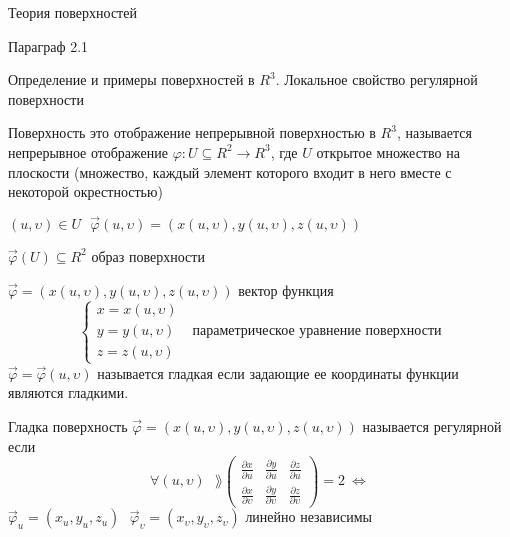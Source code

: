 \begin{title}
  Теория поверхностей
\end{title}

\begin{title}[\Large]
  Параграф 2.1
\end{title}

\begin{title}[\Large]
  Определение и примеры поверхностей в $R^3$. Локальное свойство регулярной
  поверхности
\end{title}

\begin{define}[поверхности]
  Поверхность это отображение непрерывной поверхностью в $R^3$, называется
  непрерывное отображение $\varphi: U \subseteq R^2 \to R^3$, где
  $U$ открытое множество на плоскости (множество, каждый элемент которого входит
  в него вместе с некоторой окрестностью)

  $(u, \upsilon) \in U ~~~ \vec \varphi(u, \upsilon) = (x(u, \upsilon),
  y(u, \upsilon), z(u, \upsilon))$

  $\vec \varphi (U) \subseteq R^2$ образ поверхности

  $\vec \varphi = (x(u, \upsilon), y(u, \upsilon), z(u, \upsilon))$ вектор
  функция
  $$
  \left\{
  \begin{array}{c}
    x = x(u, \upsilon) \\
    y = y(u, \upsilon) \\
    z = z(u, \upsilon)
  \end{array}
  \right. ~~~ \text{параметрическое уравнение поверхности}
  $$
  $\vec \varphi = \vec \varphi(u, \upsilon)$ называется гладкая если
  задающие ее координаты функции являются гладкими.
\end{define}

\begin{define}
  Гладка поверхность $\vec \varphi = (x(u, \upsilon), y(u, \upsilon),
  z(u, \upsilon))$ называется регулярной если
  $$
  \forall (u, \upsilon) ~~~
  \rang \left(
  \begin{array}{ccc}
    \frac{\partial x}{\partial u} & \frac{\partial y}{\partial u} &
    \frac{\partial z}{\partial u} \\
    \frac{\partial x}{\partial \upsilon} &
    \frac{\partial y}{\partial \upsilon} &
    \frac{\partial z}{\partial \upsilon}
  \end{array}
  \right) = 2 ~ \Leftrightarrow
  $$
  $\vec \varphi_u = (x_u, y_u, z_u) ~~~ \vec \varphi_{\upsilon} =
  (x_{\upsilon}, y_{\upsilon}, z_{\upsilon})$ линейно независимы
\end{define}

